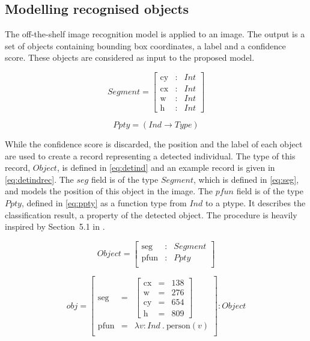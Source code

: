 \documentclass[11pt, a4paper]{article}
\begin{document}
\subsection{Modelling recognised objects}

The off-the-shelf image recognition model is applied to an image.
The output is a set of objects containing bounding box coordinates, a label and a confidence score.
These objects are considered as input to the proposed model.

\begin{equation}\label{eq:seg}
Segment = \left[\begin{array}{rcl}
\text{cy} &:& Int\\
\text{cx} &:& Int\\
\text{w} &:& Int\\
\text{h} &:& Int
\end{array}\right]\end{equation}

\begin{equation}\label{eq:ppty}
Ppty = (Ind\rightarrow Type)\end{equation}

While the confidence score is discarded, the position and the label of each object are used to create a record representing a detected individual.
The type of this record, $Object$, is defined in \autoref{eq:detind} and an example record is given in \autoref{eq:detindrec}.
The $seg$ field is of the type $Segment$, which is defined in \autoref{eq:seg}, and models the position of this object in the image.
The $pfun$ field is of the type $Ppty$, defined in \autoref{eq:ppty} as a function type from $Ind$ to a ptype.
It describes the classification result, a property of the detected object.
The procedure is heavily inspired by Section~5.1 in \cite{DobnikInterfacinglanguagespatial2017}.

\begin{equation}\label{eq:detind}
Object = \left[\begin{array}{rcl}
\text{seg} &:& Segment\\
\text{pfun} &:& Ppty \\
\end{array}\right]\end{equation}

\begin{equation}\label{eq:detindrec}
obj =
\left[\begin{array}{rcl}
\text{seg} &=& \left[\begin{array}{rcl}
\text{cx} &=& 138\\
\text{w} &=& 276\\
\text{cy} &=& 654\\
\text{h} &=& 809
\end{array}\right]\\
\text{pfun} &=& \lambda v:Ind\ .\ \text{person}(v)\\
\end{array}\right] : Object\end{equation}
\end{document}
